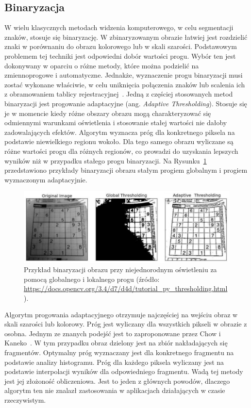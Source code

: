 \subsection{Binaryzacja}\label{subsec:binaryzacja}
W wielu klasycznych metodach widzenia komputerowego, w celu segmentacji znaków, stosuje się binaryzację.
W zbinaryzowanym obrazie łatwiej jest rozdzielić znaki w porównaniu do obrazu kolorowego lub w skali szarości.
Podstawowym problemem tej techniki jest odpowiedni dobór wartości progu.
Wybór ten jest dokonywany w oparciu o różne metody, które można podzielić na zmiennoprogowe i automatyczne.
Jednakże, wyznaczenie progu binaryzacji musi zostać wykonane właściwie, w celu uniknięcia połączenia znaków lub scalenia ich z obramowaniem tablicy rejestracyjnej~\cite{6213519}.
Jedną z częściej stosowanych metod binaryzacji jest progowanie adaptacyjne (ang. \textit{Adaptive Thresholding}).
Stosuje się je w momencie kiedy różne obszary obrazu mogą charakteryzować się odmiennymi warunkami oświetlenia i stosowanie stałej wartości nie dałoby zadowalających efektów.
Algorytm wyznacza próg dla konkretnego piksela na podstawie niewielkiego regionu wokoło.
Dla tego samego obrazu wyliczane są różne wartości progu dla różnych regionów, co prowadzi do uzyskania lepszych wyników niż w przypadku stałego progu binaryzacji.
Na Rysunku~\ref{fig:threshold} przedstawiono przykłady binaryzacji obrazu stałym progiem globalnym i progiem wyznaczonym adaptacyjnie.
\begin{figure}[!ht]
    \centering
    \includegraphics[scale=0.6]{Pictures/threshold}
    \caption{Przykład binaryzacji obrazu przy niejednorodnym oświetleniu za pomocą globalnego i lokalnego progu (źródło: \url{https://docs.opencv.org/3.4/d7/d4d/tutorial_py_thresholding.html}).}
    \label{fig:threshold}
\end{figure}
\FloatBarrier

Algorytm progowania adaptacyjnego otrzymuje najczęściej na wejściu obraz w skali szarości lub kolorowy.
Próg jest wyliczany dla wszystkich pikseli w obrazie z osobna.
Jednym ze znanych podejść jest to zaproponowane przez Chow i Kaneko~\cite{Chow1971BoundaryDO}.
W tym przypadku obraz dzielony jest na zbiór nakładających się fragmentów.
Optymalny próg wyznaczany jest dla konkretnego fragmentu na podstawie analizy histogramu.
Próg dla każdego piksela wyliczany jest na podstawie interpolacji wyników dla odpowiedniego fragmentu.
Wadą tej metody jest jej złożoność obliczeniowa.
Jest to jeden z głównych powodów, dlaczego algorytm ten nie znalazł zastosowania w aplikacjach działających w czasie rzeczywistym.

